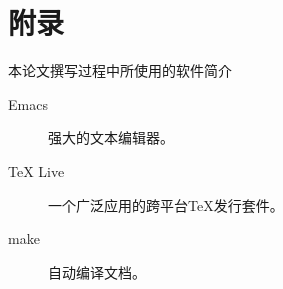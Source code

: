 \section*{附录}
本论文撰写过程中所使用的软件简介

\begin{description}
  \item[Emacs] 强大的文本编辑器。
  \item[TeX Live] 一个广泛应用的跨平台{\TeX}发行套件。
  \item[make] 自动编译文档。
\end{description}
